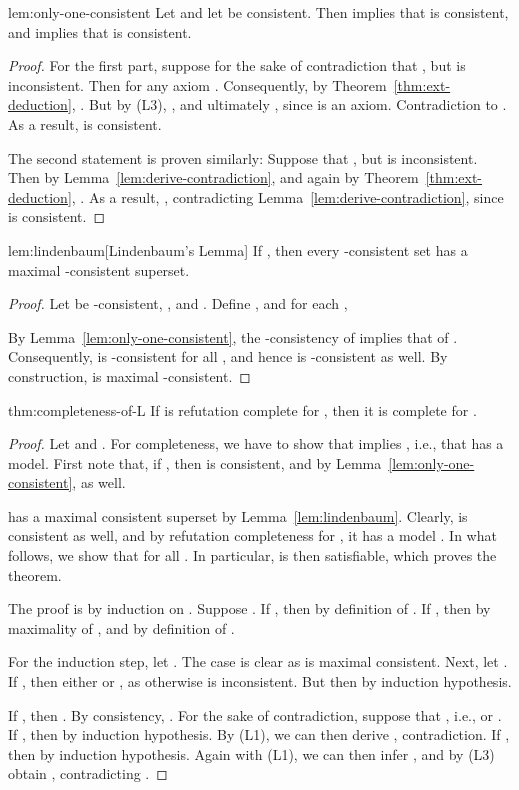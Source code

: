 \documentclass[a4paper,english,fleqn,11pt,final]{scrartcl}
\makeatletter
\newcommand{\ie}{i.e.\@\xspace}
\newcommand{\Deriv}[1]{{\normalfont\textsf{#1}}}
\theoremstyle{plain}
\theoremstyle{definition}
\makeatother
\begin{document}
\begin{replemma}{lem:only-one-consistent}
Let  and let  be consistent.
Then  implies that  is consistent, and  implies that  is consistent.
\end{replemma}
\begin{proof}
For the first part, suppose for the sake of contradiction that , but  is inconsistent.
Then  for any axiom .
Consequently, by Theorem~\ref{thm:ext-deduction}, .
But by \Deriv{(L3)}, , and ultimately , since  is an axiom.
Contradiction to .
As a result,  is consistent.

The second statement is proven similarly:
Suppose that , but  is inconsistent.
Then  by Lemma~\ref{lem:derive-contradiction}, and again by Theorem~\ref{thm:ext-deduction}, .
As a result, , contradicting Lemma~\ref{lem:derive-contradiction}, since  is consistent.
\end{proof}


\begin{replemma}{lem:lindenbaum}[Lindenbaum's Lemma]
	If , then every -consistent set has a maximal -consistent superset.
\end{replemma}
\begin{proof}
Let  be -consistent, , and .
Define , and for each ,


By Lemma~\ref{lem:only-one-consistent}, the -consistency of  implies that of .
Consequently,  is -consistent for all , and hence  is -consistent as well.
By construction,  is maximal -consistent.
\end{proof}



\begin{reptheorem}{thm:completeness-of-L}
If  is refutation complete for , then it is complete for .
\end{reptheorem}
\begin{proof}
Let  and .
For completeness, we have to show that  implies , \ie, that  has a model.
First note that, if , then  is consistent, and by Lemma~\ref{lem:only-one-consistent},  as well.




 has a maximal consistent superset  by Lemma~\ref{lem:lindenbaum}.
Clearly,  is consistent as well, and by refutation completeness for , it has a model .
In what follows, we show that  for all .
In particular,  is then satisfiable, which proves the theorem.

The proof is by induction on .
Suppose .
If , then  by definition of .
If , then  by maximality of , and  by definition of .

For the induction step, let .
The case  is clear as  is maximal consistent.
Next, let .
If , then either  or , as otherwise  is inconsistent.
But then  by induction hypothesis.

If , then .
By consistency, .
For the sake of contradiction, suppose that , \ie,  or .
If , then  by induction hypothesis.
By \Deriv{(L1)}, we can then derive , contradiction.
If , then  by induction hypothesis.
Again with \Deriv{(L1)}, we can then infer , and by \Deriv{(L3)} obtain , contradicting .
\end{proof}
 
\end{document}
